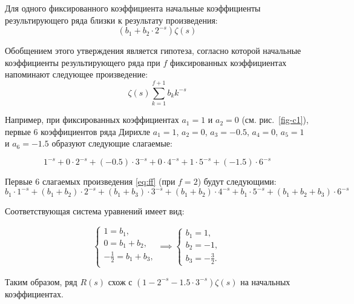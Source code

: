 \documentclass[intlimits,twoside,a4paper,11pt]{article}
\begin{document}
    Для одного фиксированного коэффициента начальные коэффициенты результирующего ряда близки к результату произведения:
    \begin{equation}
        (b_1+b_2\cdot2^{-s})\zeta(s)
    \end{equation}

    Обобщением этого утверждения является гипотеза, согласно которой начальные коэффициенты результирующего ряда при $f$ фиксированных коэффициентах напоминают следующее произведение:
    \begin{equation}\label{eq:ff}
        \zeta(s)\sum_{k=1}^{f+1}{b_k k^{-s}}
    \end{equation}

    Например, при фиксированных коэффициентах $a_1=1$ и $a_2=0$ (см. рис.~\ref{fig-c1}), первые 6 коэффициентов ряда Дирихле 
    $a_1=1$, $a_2=0$, $a_3=-0.5$, $a_4=0$, $a_5=1$ и $a_6=-1.5$ образуют следующие слагаемые:

    \begin{equation}
        1^{-s} + 0 \cdot 2^{-s} + (-0.5) \cdot 3^{-s} + 0 \cdot 4^{-s} + 1 \cdot 5^{-s} + (-1.5) \cdot 6^{-s}
    \end{equation}

    Первые 6 слагаемых произведения \ref{eq:ff} (при $f=2$) будут следующими:
    \begin{equation}
        b_1 \cdot 1^{-s} + (b_1 + b_2) \cdot 2^{-s} + (b_1 + b_3) \cdot 3^{-s} + (b_1 + b_2) \cdot 4^{-s} + b_1 \cdot 5^{-s} + (b_1 + b_2 + b_3) \cdot 6^{-s}
    \end{equation}

    Соответствующая система уравнений имеет вид:

    \begin{equation*}
        \begin{cases}
            1 = b_1, \\
            0 = b_1 + b_2,\\
            -\frac{1}{2} = b_1 + b_3,\\
        \end{cases} \implies 
        \begin{cases}
            b_1 = 1, \\
            b_2 = -1, \\
            b_3 = -\frac{3}{2}.
        \end{cases}
    \end{equation*}

    Таким образом, ряд $R(s)$ схож с $(1 - 2^{-s} - 1.5 \cdot 3^{-s}) \zeta(s)$ на начальных коэффициентах.  
\end{document}
